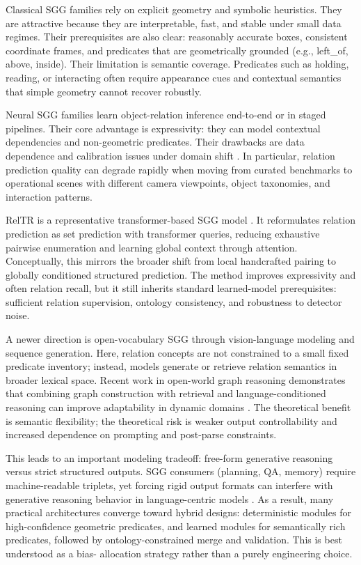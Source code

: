  Classical SGG families rely on explicit geometry and symbolic heuristics. They are attractive because they are interpretable, fast, and stable under small data regimes. Their prerequisites are also
  clear: reasonably accurate boxes, consistent coordinate frames, and predicates that are geometrically grounded (e.g., left\_of, above, inside). Their limitation is semantic coverage. Predicates such as
  holding, reading, or interacting often require appearance cues and contextual semantics that simple geometry cannot recover robustly.

  Neural SGG families learn object-relation inference end-to-end or in staged pipelines. Their core advantage is expressivity: they can model contextual dependencies and non-geometric predicates. Their
  drawbacks are data dependence and calibration issues under domain shift \cite{zhu_scene_2022}. In particular, relation prediction quality can degrade rapidly when moving from curated benchmarks to
  operational scenes with different camera viewpoints, object taxonomies, and interaction patterns.

  RelTR is a representative transformer-based SGG model \cite{cong_reltr_2023}. It reformulates relation prediction as set prediction with transformer queries, reducing exhaustive pairwise enumeration
  and learning global context through attention. Conceptually, this mirrors the broader shift from local handcrafted pairing to globally conditioned structured prediction. The method improves
  expressivity and often relation recall, but it still inherits standard learned-model prerequisites: sufficient relation supervision, ontology consistency, and robustness to detector noise.

  A newer direction is open-vocabulary SGG through vision-language modeling and sequence generation. Here, relation concepts are not constrained to a small fixed predicate inventory; instead, models
  generate or retrieve relation semantics in broader lexical space. Recent work in open-world graph reasoning demonstrates that combining graph construction with retrieval and language-conditioned
  reasoning can improve adaptability in dynamic domains \cite{wang_indvissgg_2025}. The theoretical benefit is semantic flexibility; the theoretical risk is weaker output controllability and increased
  dependence on prompting and post-parse constraints.

  This leads to an important modeling tradeoff: free-form generative reasoning versus strict structured outputs. SGG consumers (planning, QA, memory) require machine-readable triplets, yet forcing rigid
  output formats can interfere with generative reasoning behavior in language-centric models \cite{tam_let_2024}. As a result, many practical architectures converge toward hybrid designs: deterministic
  modules for high-confidence geometric predicates, and learned modules for semantically rich predicates, followed by ontology-constrained merge and validation. This is best understood as a bias-
  allocation strategy rather than a purely engineering choice.


